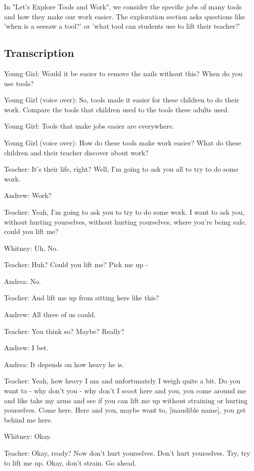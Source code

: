 In "Let's Explore Tools and Work", we consider the specific jobs of many tools and how they make our work easier. The exploration section asks questions like 'when is a seesaw a tool?' or 'what tool can students use to lift their teacher?'

\subsection{Transcription}

Young Girl: Would it be easier to remove the nails without this? When do you use tools?

Young Girl (voice over): So, tools made it easier for these children to do their work. Compare the tools that children used to the tools these adults used.

Young Girl: Tools that make jobs easier are everywhere.

Young Girl (voice over): How do these tools make work easier? What do these children and their teacher discover about work?

Teacher: It's their life, right? Well, I'm going to ask you all to try to do some work.

Andrew: Work?

Teacher: Yeah, I'm going to ask you to try to do some work. I want to ask you, without hurting yourselves, without hurting yourselves, where you're being safe, could you lift me?

Whitney: Uh, No.

Teacher: Huh? Could you lift me? Pick me up -

Andrea: No.

Teacher: And lift me up from sitting here like this?

Andrew: All three of us could.

Teacher: You think so? Maybe? Really?

Andrew: I bet.

Andrea: It depends on how heavy he is.

Teacher: Yeah, how heavy I am and unfortunately I weigh quite a bit. Do you want to - why don't you - why don't I scoot here and you, you come around me and like take my arms and see if you can lift me up without straining or hurting yourselves. Come here. Here and you, maybe want to, [inaudible name], you get behind me here.

Whitney: Okay.

Teacher: Okay, ready? Now don't hurt yourselves. Don't hurt yourselves. Try, try to lift me up. Okay, don't strain. Go ahead.

